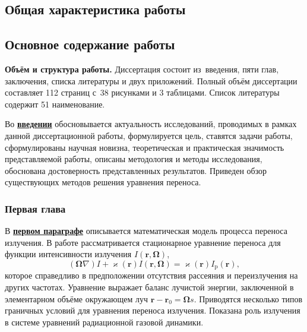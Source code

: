 \subsection*{Общая характеристика работы}


\newcommand{\contribution}{{\textbf{Личный вклад автора в публикации с соавторами.}}}


\newcommand{\epar}[1]{\underline{\textbf{#1}}}

\subsection*{Основное содержание работы}
\textbf{Объём и структура работы.} Диссертация состоит из~введения, пяти глав, заключения, списка литературы и двух приложений. Полный объём диссертации составляет 112 страниц
с~38 рисунками и 3 таблицами. Список литературы содержит 51 наименование.

Во \epar{введении} обосновывается актуальность исследований, проводимых в рамках данной диссертационной работы, формулируется цель, ставятся задачи работы, сформулированы научная новизна, теоретическая и практическая значимость представляемой работы, описаны методология и методы исследования, обоснована достоверность представленных результатов. Приведен обзор существующих методов решения уравнения переноса.


\subsubsection*{Первая глава}
В \epar{первом параграфе} описывается математическая модель процесса переноса излучения. 
В работе рассматривается стационарное уравнение переноса для функции интенсивности излучения
$I(\mathbf r, \boldsymbol \Omega)$, 
\[
(\boldsymbol \Omega  \nabla) I + \varkappa(\mathbf r) I(\mathbf r, \boldsymbol \Omega) = \varkappa(\mathbf r) I_\text{p}(\mathbf r),
\]
которое справедливо в предположении отсутствия рассеяния и переизлучения на других частотах. Уравнение выражает баланс лучистой энергии, заключенной в элементарном объёме окружающем луч $\mathbf r - \mathbf r_0 = \boldsymbol \Omega s$. Приводятся несколько типов граничных условий для уравнения переноса излучения. Показана роль излучения в системе уравнений радиационной газовой динамики. 

